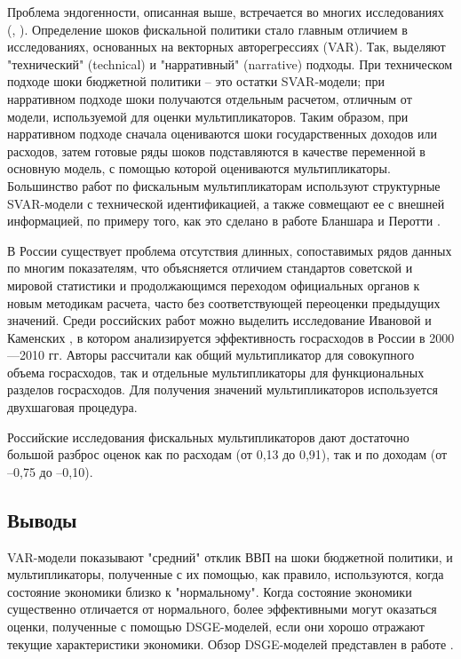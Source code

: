 \documentclass[12pt, a4paper]{extarticle}
\begin{document}
\par
    Проблема эндогенности, описанная выше, встречается во многих исследованиях (\cite{blanchard}, \cite{favero}). Определение шоков фискальной политики стало главным отличием в исследованиях, основанных на векторных авторегрессиях (VAR). Так, выделяют "технический" (technical) и "нарративный" (narrative) подходы. При техническом подходе шоки бюджетной политики -- это остатки SVAR-модели; при нарративном подходе шоки получаются отдельным расчетом, отличным от модели, используемой для оценки мультипликаторов. Таким образом, при нарративном подходе сначала оцениваются шоки государственных доходов или расходов, затем готовые ряды шоков подставляются в качестве переменной в основную модель, с помощью которой оцениваются мультипликаторы. Большинство работ по фискальным мультипликаторам используют структурные SVAR-модели с технической идентификацией, а также совмещают ее с внешней информацией, по примеру того, как это сделано в работе Бланшара и Перотти \cite{blanchard}.
    
    
\par
    В России существует проблема отсутствия длинных, сопоставимых рядов данных по многим показателям, что объясняется отличием стандартов советской и мировой статистики и продолжающимся переходом официальных органов к новым методикам расчета, часто без соответствующей переоценки предыдущих значений. Среди российских работ можно выделить исследование Ивановой и Каменских \cite{ivanova}, в котором анализируется эффективность госрасходов в России в 2000—2010 гг. Авторы рассчитали как общий мультипликатор для совокупного объема госрасходов, так и отдельные мультипликаторы для функциональных разделов госрасходов. Для получения значений мультипликаторов используется двухшаговая процедура.
    
\par
     Российские исследования фискальных мультипликаторов дают достаточно большой разброс оценок как по расходам (от 0,13 до 0,91), так и по доходам (от –0,75 до –0,10).


\subsection*{{Выводы}}

\par
    VAR-модели показывают "средний" отклик ВВП на шоки бюджетной политики, и мультипликаторы, полученные с их помощью, как правило, используются, когда состояние экономики близко к "нормальному". Когда состояние экономики существенно отличается от нормального, более эффективными могут оказаться оценки, полученные с помощью DSGE-моделей, если они хорошо отражают текущие характеристики экономики. Обзор DSGE-моделей представлен в работе \cite{dsge}.
\end{document}
